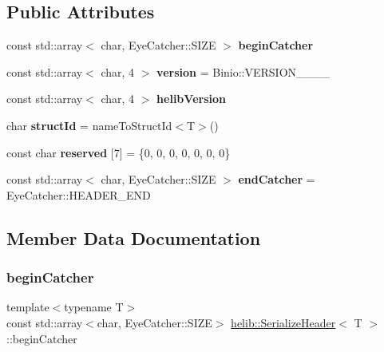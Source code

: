 \subsection*{Public Attributes}
\begin{DoxyCompactItemize}
\item 
const std\+::array$<$ char, Eye\+Catcher\+::\+S\+I\+ZE $>$ {\bfseries begin\+Catcher}
\item 
\mbox{\label{structhelib_1_1SerializeHeader_af39d1b049b54e280f71b9543e3bb9e52}} 
const std\+::array$<$ char, 4 $>$ {\bfseries version} = Binio\+::\+V\+E\+R\+S\+I\+O\+N\+\_\+\_\+\_\+\_
\item 
const std\+::array$<$ char, 4 $>$ {\bfseries helib\+Version}
\item 
\mbox{\label{structhelib_1_1SerializeHeader_a03c2ec80fb75a51548259ffc304339f8}} 
char {\bfseries struct\+Id} = name\+To\+Struct\+Id$<$T$>$()
\item 
\mbox{\label{structhelib_1_1SerializeHeader_a20415e5022b4b58ee79ae2580636c11c}} 
const char {\bfseries reserved} \mbox{[}7\mbox{]} = \{0, 0, 0, 0, 0, 0, 0\}
\item 
\mbox{\label{structhelib_1_1SerializeHeader_a205de8fae7631a225b2a87eba2723d80}} 
const std\+::array$<$ char, Eye\+Catcher\+::\+S\+I\+ZE $>$ {\bfseries end\+Catcher} = Eye\+Catcher\+::\+H\+E\+A\+D\+E\+R\+\_\+\+E\+ND
\end{DoxyCompactItemize}


\subsection{Member Data Documentation}
\mbox{\label{structhelib_1_1SerializeHeader_a94bcb6d89d28030ea864605af1f34341}} 
\subsubsection{\texorpdfstring{begin\+Catcher}{beginCatcher}}
{\footnotesize\ttfamily template$<$typename T$>$ \\
const std\+::array$<$char, Eye\+Catcher\+::\+S\+I\+ZE$>$ \hyperlink{structhelib_1_1SerializeHeader}{helib\+::\+Serialize\+Header}$<$ T $>$\+::begin\+Catcher}

